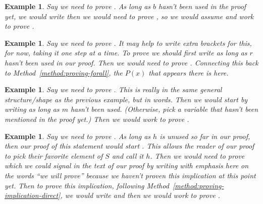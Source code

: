 \documentclass{book}
\newcounter{ekcounter}%
\theoremstyle{ekimcustom}
\newtheorem{example}[ekcounter]{Example}
\begin{document}
\begin{example} %
Say we need to prove . As long as $b$ hasn't been used in the proof yet, we would write  then we would need to prove , so we would assume  and work to prove .
\end{example}
\begin{example} %
Say we need to prove . It may help to write extra brackets for this, for now, taking it one step at a time. To prove  we should first write  as long as $r$ hasn't been used in our proof. Then we would need to prove . Connecting this back to Method~\ref{method:proving-forall}, the $P(x)$ that appears there is  here.
\end{example}
\begin{example} %
Say we need to prove . This is really in the same general structure/shape as the previous example, but in words. Then we would start by writing  as long as $m$ hasn't been used. (Otherwise, pick a variable that hasn't been mentioned in the proof yet.) Then we would work to prove .
\end{example}

\begin{example}
Say we need to prove . As long as $h$ is unused so far in our proof, then our proof of this statement would start . This allows the reader of our proof to pick their favorite element of $S$ and call it $h$. Then we would need to prove  which we could signal in the text of our proof by writing  with emphasis here on the words ``we will prove'' because we haven't proven this implication at this point yet. Then to prove this implication, following Method~\ref{method:proving-implication-direct}, we would write  and then we would work to prove .
\end{example}
\end{document}
